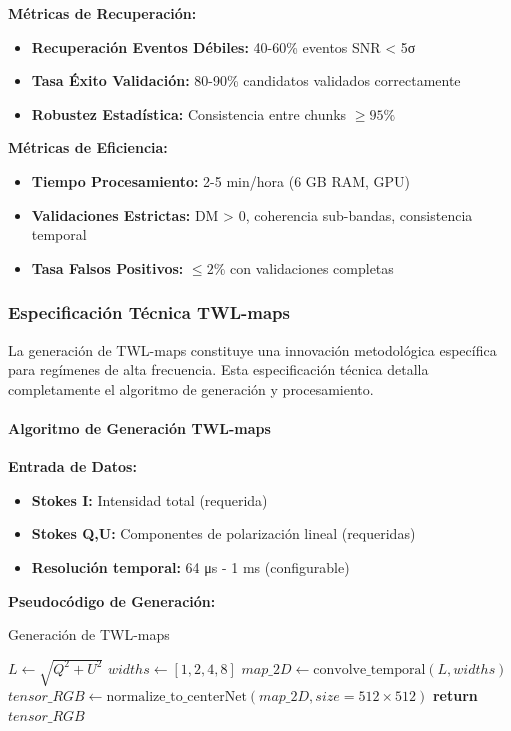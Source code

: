 \textbf{Métricas de Recuperación:}
\begin{itemize}
\item \textbf{Recuperación Eventos Débiles:} 40-60\% eventos SNR < 5σ
\item \textbf{Tasa Éxito Validación:} 80-90\% candidatos validados correctamente
\item \textbf{Robustez Estadística:} Consistencia entre chunks $\geq 95\%$
\end{itemize}

\textbf{Métricas de Eficiencia:}
\begin{itemize}
\item \textbf{Tiempo Procesamiento:} 2-5 min/hora (6 GB RAM, GPU)
\item \textbf{Validaciones Estrictas:} DM > 0, coherencia sub-bandas, consistencia temporal
\item \textbf{Tasa Falsos Positivos:} $\leq 2\%$ con validaciones completas
\end{itemize}

\subsubsection{Especificación Técnica TWL-maps}

La generación de TWL-maps constituye una innovación metodológica específica para regímenes de alta frecuencia. Esta especificación técnica detalla completamente el algoritmo de generación y procesamiento.

\paragraph{Algoritmo de Generación TWL-maps}

\textbf{Entrada de Datos:}
\begin{itemize}
\item \textbf{Stokes I:} Intensidad total (requerida)
\item \textbf{Stokes Q,U:} Componentes de polarización lineal (requeridas)
\item \textbf{Resolución temporal:} 64 μs - 1 ms (configurable)
\end{itemize}

\textbf{Pseudocódigo de Generación:}

\begin{algorithm}[H]
\caption{Generación de TWL-maps}
\begin{algorithmic}[1]
    \State $L \leftarrow \sqrt{Q^2 + U^2}$ 
    \State $widths \leftarrow [1, 2, 4, 8]$ 
    \State $map\_2D \leftarrow \text{convolve\_temporal}(L, widths)$
    \State $tensor\_RGB \leftarrow \text{normalize\_to\_centerNet}(map\_2D, size=512\times512)$
    \State \textbf{return} $tensor\_RGB$
\EndFunction
\end{algorithmic}
\end{algorithm}

